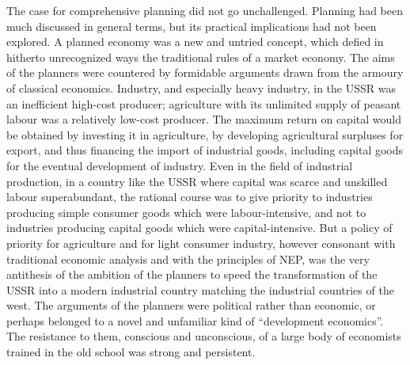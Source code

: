 The case for comprehensive planning did not go unchallenged. Planning had been much discussed in general terms, but its practical implications had not been explored. A planned economy was a new and untried concept, which defied in hitherto unrecognized ways the traditional rules of a market economy. The aims of the planners were countered by formidable arguments drawn from the armoury of classical economics. Industry, and especially heavy industry, in the USSR was an inefficient high-cost producer; agriculture with its unlimited supply of peasant labour was a relatively low-cost producer. The maximum return on capital would be obtained by investing it in agriculture, by developing agricultural surpluses for export, and thus financing the import of industrial goods, including capital goods for the eventual development of industry. Even in the field of industrial production, in a country like the USSR where capital was scarce and unskilled labour superabundant, the rational course was to give priority to industries producing simple consumer goods which were labour-intensive, and not to industries producing capital goods which were capital-intensive. But a policy of priority for agriculture and for light consumer industry, however consonant with traditional economic analysis and with the principles of NEP, was the very antithesis of the ambition of the planners to speed the transformation of the USSR into a modern industrial country matching the industrial countries of the west. The arguments of the planners were political rather than economic, or perhaps belonged to a novel and unfamiliar kind of ``development economics''. The resistance to them, conscious and unconscious, of a large body of economists trained in the old school was strong and persistent. 


